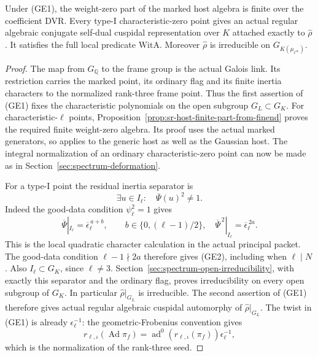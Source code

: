 \begin{srproposition}\label{prop:sr-generic-three-exact-endpoint}
Under (GE1), the weight-zero part of the marked host
algebra is finite over the coefficient DVR.
Every type-I characteristic-zero point gives an actual
regular algebraic conjugate self-dual cuspidal representation
over \(K\) attached exactly to \(\widehat\rho\).
It satisfies the full local predicate \(\mathrm{WitA}\).
Moreover \(\widehat\rho\) is irreducible on
\(G_{K(\mu_{\ell^\infty})}\).
\end{srproposition}
\begin{proof}
The map from \(G_{\mathbb Q}\) to the frame group is the
actual Galois link.
Its restriction carries the marked point, its ordinary
flag and its finite inertia characters to the normalized
rank-three frame point.
Thus the first assertion of (GE1) fixes the characteristic
polynomials on the open subgroup \(G_L\subset G_K\).
For characteristic-\(\ell\) points,
Proposition~\ref{prop:sr-host-finite-part-from-finend}
proves the required finite weight-zero algebra.
Its proof uses the actual marked generators, so applies
to the generic host as well as the Gaussian host.
The integral normalization of an ordinary characteristic-zero
point can now be made as in
Section~\ref{sec:spectrum-deformation}.

For a type-I point the residual inertia separator is
\[
 \exists u\in I_\ell:\quad \overline\Psi(u)^2\ne1.
 \tag{GE2}
\]
Indeed the good-data condition \(\psi_\ell^2=1\)
gives
\[
 \overline\Psi|_{I_\ell}
      =\overline\epsilon_\ell^{\,a+b},
       \qquad b\in\{0,(\ell-1)/2\},
 \quad
 \overline\Psi^{\,2}|_{I_\ell}
      =\overline\epsilon_\ell^{\,2a}.
\]
This is the local quadratic character calculation in the
actual principal packet.
The good-data condition \(\ell-1\nmid2a\) therefore
gives (GE2), including when \(\ell\mid N\).
Also \(I_\ell\subset G_K\), since \(\ell\ne3\).
Section~\ref{sec:spectrum-open-irreducibility},
with exactly this separator and the ordinary flag,
proves irreducibility on every open subgroup of \(G_K\).
In particular \(\widehat\rho|_{G_L}\) is irreducible.
The second assertion of (GE1) therefore gives actual
regular algebraic cuspidal automorphy of
\(\widehat\rho|_{G_L}\).
The twist in (GE1) is already \(\epsilon_\ell^{-1}\):
the geometric-Frobenius convention gives
\[
 r_{\ell,\iota}(\operatorname{Ad}\pi_f)
       =\operatorname{ad}^0(r_{\ell,\iota}(\pi_f))
                                      \epsilon_\ell^{-1},
\]
which is the normalization of the rank-three seed.


\end{proof}
